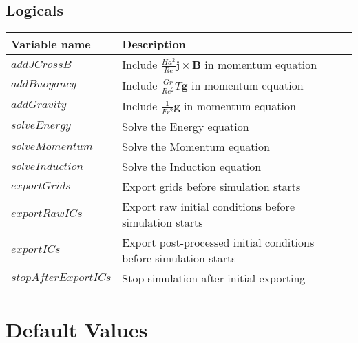 \documentclass[11pt]{article}
\begin{document}
\subsection{Logicals}
\begin{tabular}{ | l | l | }
\hline  \textbf{Variable name}  & \textbf{Description} \\
\hline $addJCrossB$         & Include $\frac{Ha^2}{Re} \mathbf{j}\times \mathbf{B}$ in momentum equation \\
\hline $addBuoyancy$        & Include $\frac{Gr}{Re^2} T \mathbf{g} $ in momentum equation               \\
\hline $addGravity$         & Include $\frac{1}{Fr^2} \mathbf{g} $ in momentum equation                  \\
\hline $solveEnergy$        & Solve the Energy equation                                                  \\
\hline $solveMomentum$      & Solve the Momentum equation                                                \\
\hline $solveInduction$     & Solve the Induction equation                                               \\
\hline $exportGrids$        & Export grids before simulation starts                                      \\
\hline $exportRawICs$       & Export raw initial conditions before simulation starts                     \\
\hline $exportICs$          & Export post-processed initial conditions before simulation starts          \\
\hline $stopAfterExportICs$ & Stop simulation after initial exporting                                    \\
\hline
\end{tabular}

\section{Default Values}
\end{document}
